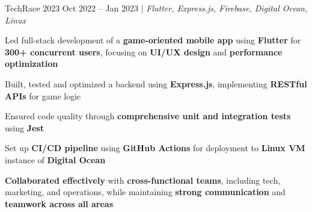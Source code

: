 \resumeSubheadings
{TechRace 2023 }
{Oct 2022 -- Jan 2023}
{}{}{| \textit{Flutter, Express.js, Firebase, Digital Ocean, Linux}}
\resumeItemListStart
\item Led full-stack development of a \textbf{game-oriented mobile app} using \textbf{Flutter} for \textbf{300+ concurrent users}, focusing on \textbf{UI/UX design} and \textbf{performance optimization}
\item Built, tested and optimized a backend using \textbf{Express.js}, implementing \textbf{RESTful APIs} for game logic
\item Ensured code quality through \textbf{comprehensive unit and integration tests} using \textbf{Jest}
\item Set up \textbf{CI/CD pipeline} using \textbf{GitHub Actions} for deployment to \textbf{Linux VM} instance of \textbf{Digital Ocean}
\item \textbf{Collaborated effectively} with \textbf{cross-functional teams}, including tech, marketing, and operations, while maintaining \textbf{strong communication} and \textbf{teamwork across all areas}
\resumeItemListEnd